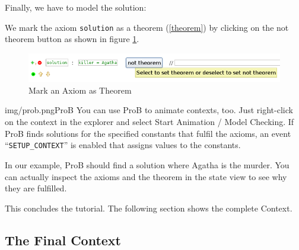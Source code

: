 Finally, we have to model the solution:


We mark the axiom \texttt{solution} as a theorem (\ref{theorem}) by clicking on the \textsf{not theorem} button as shown in figure \ref{fig_tut_05_mark_theorem}.

\begin{figure}[!h]
\begin{center}
	\includegraphics{img/tutorial/tut_05_agatha3.png}
	\caption{Mark an Axiom as Theorem}
	\label{fig_tut_05_mark_theorem}
\end{center}
\end{figure}


\begin{rodin-plugin}{img/prob.png}{ProB}%
  You can use ProB to animate contexts, too.
  Just right-click on the context in the explorer and select \textsf{Start Animation / Model Checking}.
  If ProB finds solutions for the specified constants that fulfil the axioms,
  an event ``\texttt{SETUP\_CONTEXT}'' is enabled that assigns values to the constants.

  In our example, ProB should find a solution where Agatha is the murder. You can actually inspect
  the axioms and the theorem in the state view to see why they are fulfilled.
\end{rodin-plugin}

This concludes the tutorial. The following section shows the complete Context.

\subsection{The Final Context} \label{tut_05_final_context}


